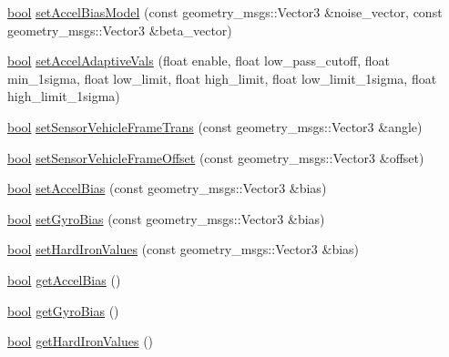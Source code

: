 \begin{DoxyCompactItemize}
\item 
\hyperlink{classbool}{bool} \hyperlink{classcl__microstrain__mips__client_1_1ClMicrostainMips_a9c450916e9868d1f5ef50ac351495a18}{set\+Accel\+Bias\+Model} (const geometry\+\_\+msgs\+::\+Vector3 \&noise\+\_\+vector, const geometry\+\_\+msgs\+::\+Vector3 \&beta\+\_\+vector)
\item 
\hyperlink{classbool}{bool} \hyperlink{classcl__microstrain__mips__client_1_1ClMicrostainMips_aa916d50ea139798498456cf651d7bb98}{set\+Accel\+Adaptive\+Vals} (float enable, float low\+\_\+pass\+\_\+cutoff, float min\+\_\+1sigma, float low\+\_\+limit, float high\+\_\+limit, float low\+\_\+limit\+\_\+1sigma, float high\+\_\+limit\+\_\+1sigma)
\item 
\hyperlink{classbool}{bool} \hyperlink{classcl__microstrain__mips__client_1_1ClMicrostainMips_a9407da87365e7bcdfe18914a47dfb538}{set\+Sensor\+Vehicle\+Frame\+Trans} (const geometry\+\_\+msgs\+::\+Vector3 \&angle)
\item 
\hyperlink{classbool}{bool} \hyperlink{classcl__microstrain__mips__client_1_1ClMicrostainMips_a3f49064d16894c680252c7846b185f86}{set\+Sensor\+Vehicle\+Frame\+Offset} (const geometry\+\_\+msgs\+::\+Vector3 \&offset)
\item 
\hyperlink{classbool}{bool} \hyperlink{classcl__microstrain__mips__client_1_1ClMicrostainMips_a046a87bed369154ae555a032f0f63786}{set\+Accel\+Bias} (const geometry\+\_\+msgs\+::\+Vector3 \&bias)
\item 
\hyperlink{classbool}{bool} \hyperlink{classcl__microstrain__mips__client_1_1ClMicrostainMips_ad35c05dbb62df3e98dbddf71385a08d3}{set\+Gyro\+Bias} (const geometry\+\_\+msgs\+::\+Vector3 \&bias)
\item 
\hyperlink{classbool}{bool} \hyperlink{classcl__microstrain__mips__client_1_1ClMicrostainMips_a090325995dc5b90b5d905b5e585cdbd4}{set\+Hard\+Iron\+Values} (const geometry\+\_\+msgs\+::\+Vector3 \&bias)
\item 
\hyperlink{classbool}{bool} \hyperlink{classcl__microstrain__mips__client_1_1ClMicrostainMips_a689a8643f8a4fcc5db0c6cf4bf6f2118}{get\+Accel\+Bias} ()
\item 
\hyperlink{classbool}{bool} \hyperlink{classcl__microstrain__mips__client_1_1ClMicrostainMips_a67991a111f2b9144faaf070bdb2295ca}{get\+Gyro\+Bias} ()
\item 
\hyperlink{classbool}{bool} \hyperlink{classcl__microstrain__mips__client_1_1ClMicrostainMips_a34d87437c5cb24a9b82918bc9a683e63}{get\+Hard\+Iron\+Values} ()
\item 

\end{DoxyCompactItemize}
